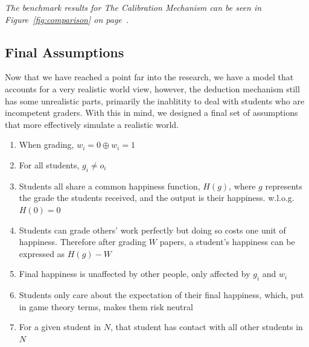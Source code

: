 \documentclass[12pt, Arial]{article}
\begin{document}
\emph{The benchmark results for The Calibration Mechanism can be seen in Figure~\ref{fig:comparison} on page~\pageref{fig:comparison}.}

\subsection{Final Assumptions}
Now that we have reached a point far into the research, we have a model that accounts for a very realistic world view, however, the deduction mechanism still has some unrealistic parts, primarily the inablitity to deal with students who are incompetent graders. With this in mind, we designed a final set of assumptions that more effectively simulate a realistic world.

\begin{enumerate}[itemsep=0pt, parsep=0pt]
\item When grading, $w_i=0 \oplus w_i=1$
\item For all students, $g_i \neq o_i$
\item Students all share a common happiness function, $H(g)$, where $g$ represents the grade the students received, and the output is their happiness. w.l.o.g. $H(0)=0$
\item Students can grade others' work perfectly but doing so costs one unit of happiness. Therefore after grading $W$ papers, a student's happiness can be expressed as $H(g)-W$
\item Final happiness is unaffected by other people, only affected by $g_i$ and $w_i$
\item Students only care about the expectation of their final happiness, which, put in game theory terms, makes them risk neutral
\item For a given student in $N$, that student has contact with all other students in $N$
\end{enumerate}
\end{document}
